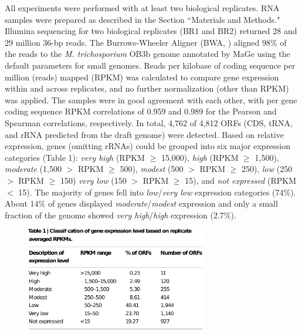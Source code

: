 All experiments were performed with at least two biological replicates.
RNA samples were prepared as described in the Section ``Materials and Methods."
Illumina sequencing for two biological replicates (BR1 and BR2) returned 28 and 29 million 36-bp reads.
The Burrows-Wheeler Aligner (BWA, \cite{li2009}) aligned 98\% of the reads to the \textit{M. trichosporium} OB3b genome annotated by MaGe \cite{vallenet2006} using the default parameters for small genomes.
Reads per kilobase of coding sequence per million (reads) mapped (RPKM) \cite{mortazavi2008} was calculated to compare gene expression within and across replicates, and no further normalization (other than RPKM) was applied.
The samples were in good agreement with each other, with per gene coding sequence RPKM correlations of 0.959 and 0.989 for the Pearson and Spearman correlations, respectively.
In total, 4,762 of 4,812 ORFs (CDS, tRNA, and rRNA predicted from the draft genome) were detected.
Based on relative expression, genes (omitting rRNAs) could be grouped into six major expression categories (Table 1): \textit{very high} (RPKM $\geq$ 15,000), \textit{high} (RPKM $\geq$ 1,500), \textit{moderate} (1,500 $>$ RPKM $\geq$ 500), \textit{modest} (500 $>$ RPKM $\geq$ 250), \textit{low} (250 $>$ RPKM $\geq$ 150) \textit{very low} (150 $>$ RPKM $\geq$ 15), and \textit{not expressed} (RPKM $<$ 15).
The majority of genes fell into \textit{low}/\textit{very low} expression categories (74\%).
About 14\% of genes displayed \textit{moderate}/\textit{modest} expression and only a small fraction of the genome showed \textit{very high}/\textit{high} expression (2.7\%).

\begin{figure}[H]
\centering
     \includegraphics[width=0.7\textwidth]{./tex/chapter1/figures/matsen_OB3b_table1_page--cropped.pdf}
     \begin{singlespace}
     \label{table:OB3b_1} %
     \end{singlespace}
\end{figure}

